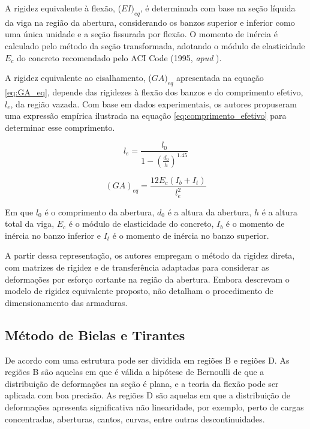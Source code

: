 A rigidez equivalente à flexão, ($EI)_{eq}$, é determinada com base na seção líquida da viga na região da abertura, considerando os banzos superior e inferior como uma única unidade e a seção fissurada por flexão. O momento de inércia é calculado pelo método da seção transformada, adotando o módulo de elasticidade $E_{c}$ do concreto recomendado pelo ACI Code (1995, \textit{apud} ).

A rigidez equivalente ao cisalhamento, ($GA)_{eq}$ apresentada na equação \ref{eq:GA_eq}, depende das rigidezes à flexão dos banzos e do comprimento efetivo, $l_{e}$, da região vazada. Com base em dados experimentais, os autores propuseram uma expressão empírica ilustrada na equação \ref{eq:comprimento_efetivo} para determinar esse comprimento.

\begin{equation}
    l_e = \frac{l_0}{1 - \left(\frac{d_0}{h}\right)^{1.45}}
    \label{eq:comprimento_efetivo}
\end{equation}

\begin{equation}
    (GA)_{eq} = \frac{12E_c(I_b+I_t)}{l_e^2}
    \label{eq:GA_eq}
\end{equation}

Em que $l_{0}$ é o comprimento da abertura,  $d_{0}$ é a altura da abertura, $h$ é a altura total da viga, $E_{c}$ é o módulo de elasticidade do concreto, $I_{b}$ é o momento de inércia no banzo inferior e $I_{t}$ é o momento de inércia no banzo superior.

A partir dessa representação, os autores empregam o método da rigidez direta, com matrizes de rigidez e de transferência adaptadas para considerar as deformações por esforço cortante na região da abertura. Embora descrevam o modelo de rigidez equivalente proposto, não detalham o procedimento de dimensionamento das armaduras.

\subsection{Método de Bielas e Tirantes}

De acordo com  uma estrutura pode ser dividida em regiões B e regiões D. 
As regiões B são aquelas em que é válida a hipótese de Bernoulli de que a distribuição de deformações na seção é plana, e a teoria da flexão pode ser aplicada com boa precisão. 
As regiões D são aquelas em que a distribuição de deformações apresenta significativa não linearidade, por exemplo, perto de cargas concentradas, aberturas, cantos, curvas, entre outras descontinuidades.

